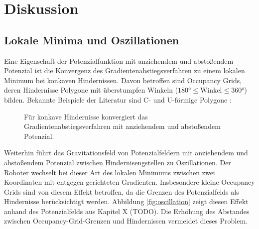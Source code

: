 \chapter{Diskussion}

\section{Lokale Minima und Oszillationen}

Eine Eigenschaft der Potenzialfunktion mit anziehendem und abstoßendem Potenzial ist die Konvergenz des Gradientenabstiegsverfahren zu einem lokalen Minimum bei konkaven Hindernissen.
Davon betroffen sind Occupancy Grids, deren Hindernisse Polygone mit überstumpfen Winkeln ($180\text{°} \le \text{Winkel} \le 360\text{°}$) bilden.
Bekannte Beispiele der Literatur sind C- und U-förmige Polygone \cite{maqbool.2021, yujiang.2017}:
\begin{figure}[h!]
	\centering
	\footnotesize
	\centerline{}
	\caption{Für konkave Hindernisse konvergiert das Gradientenabstiegsverfahren mit anziehendem und abstoßendem Potenzial.}
\end{figure}

Weiterhin führt das Gravitationsfeld von Potenzialfeldern mit anziehendem und abstoßendem Potenzial zwischen Hindernisengstellen zu Oszillationen. Der Roboter wechselt bei dieser Art des lokalen Minimums zwischen zwei Koordinaten mit entgegen gerichteten Gradienten.
Insbesondere kleine Occupancy Grids sind von diesem Effekt betroffen, da die Grenzen des Potenzialfelds als Hindernisse berücksichtigt werden. Abbildung \ref{fig:oscillation} zeigt diesen Effekt anhand des Potenzialfelds aus Kapitel X (TODO).
Die Erhöhung des Abstandes zwischen Occupancy-Grid-Grenzen und Hindernissen vermeidet dieses Problem.

